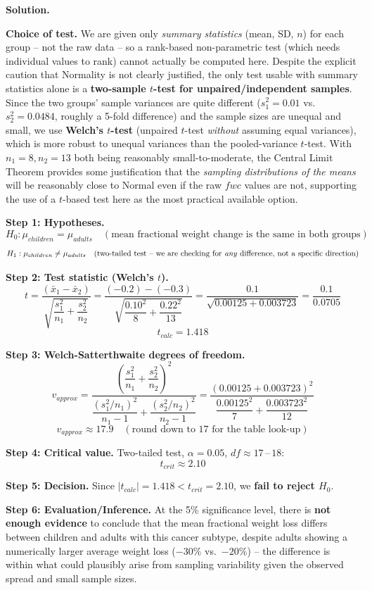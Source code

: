 \documentclass[11pt]{article}
\newcommand{\soln}{\par\noindent\textcolor{acolor}{\textbf{Solution.}}\quad}
\begin{document}
\soln

\textbf{Choice of test.} We are given only \emph{summary statistics} (mean, SD, $n$) for each group -- not the raw data -- so a rank-based non-parametric test (which needs individual values to rank) cannot actually be computed here. Despite the explicit caution that Normality is not clearly justified, the only test usable with summary statistics alone is a \textbf{two-sample $t$-test for unpaired/independent samples}. Since the two groups' sample variances are quite different ($s_1^2=0.01$ vs.\ $s_2^2=0.0484$, roughly a 5-fold difference) and the sample sizes are unequal and small, we use \textbf{Welch's $t$-test} (unpaired $t$-test \emph{without} assuming equal variances), which is more robust to unequal variances than the pooled-variance $t$-test. With $n_1=8, n_2=13$ both being reasonably small-to-moderate, the Central Limit Theorem provides some justification that the \emph{sampling distributions of the means} will be reasonably close to Normal even if the raw $fwc$ values are not, supporting the use of a $t$-based test here as the most practical available option.

\textbf{Step 1: Hypotheses.}
\[
H_0: \mu_{children} = \mu_{adults} \quad (\text{mean fractional weight change is the same in both groups})
\]
\[
H_1: \mu_{children} \neq \mu_{adults} \quad (\text{two-tailed test -- we are checking for \emph{any} difference, not a specific direction})
\]

\textbf{Step 2: Test statistic (Welch's $t$).}
\[
t = \frac{(\bar{x}_1-\bar{x}_2)}{\sqrt{\dfrac{s_1^2}{n_1}+\dfrac{s_2^2}{n_2}}} = \frac{(-0.2)-(-0.3)}{\sqrt{\dfrac{0.10^2}{8}+\dfrac{0.22^2}{13}}} = \frac{0.1}{\sqrt{0.00125+0.003723}}= \frac{0.1}{0.0705}
\]
\[
\boxed{t_{calc} = 1.418}
\]

\textbf{Step 3: Welch-Satterthwaite degrees of freedom.}
\[
v_{approx} = \frac{\left(\dfrac{s_1^2}{n_1}+\dfrac{s_2^2}{n_2}\right)^2}{\dfrac{\left(s_1^2/n_1\right)^2}{n_1-1}+\dfrac{\left(s_2^2/n_2\right)^2}{n_2-1}} = \frac{(0.00125+0.003723)^2}{\dfrac{0.00125^2}{7}+\dfrac{0.003723^2}{12}}
\]
\[
\boxed{v_{approx} \approx 17.9 \quad (\text{round down to } 17 \text{ for the table look-up})}
\]

\textbf{Step 4: Critical value.} Two-tailed test, $\alpha=0.05$, $df\approx17$\,--\,$18$:
\[
t_{crit} \approx 2.10
\]

\textbf{Step 5: Decision.} Since $|t_{calc}| = 1.418 < t_{crit} = 2.10$, we \textbf{fail to reject $H_0$}.

\textbf{Step 6: Evaluation/Inference.} At the 5\% significance level, there is \textbf{not enough evidence} to conclude that the mean fractional weight loss differs between children and adults with this cancer subtype, despite adults showing a numerically larger average weight loss ($-30\%$ vs.\ $-20\%$) -- the difference is within what could plausibly arise from sampling variability given the observed spread and small sample sizes.
\end{document}
